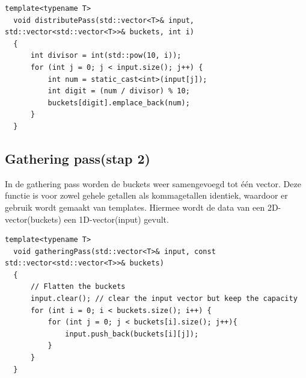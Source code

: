\documentclass{article}
\begin{document}
\begin{lstlisting}[caption={Distribution pass}, label={lst:distribution}]
  template<typename T>
  void distributePass(std::vector<T>& input, std::vector<std::vector<T>>& buckets, int i)
  {   
      int divisor = int(std::pow(10, i));
      for (int j = 0; j < input.size(); j++) {
          int num = static_cast<int>(input[j]);
          int digit = (num / divisor) % 10;
          buckets[digit].emplace_back(num);
      }
  }
\end{lstlisting}
\subsection{Gathering pass(stap 2)}
In de gathering pass worden de buckets weer samengevoegd tot één vector. Deze functie is voor zowel gehele getallen als kommagetallen identiek, 
waardoor er gebruik wordt gemaakt van templates. Hiermee wordt de data van een 2D-vector(buckets) een 1D-vector(input) gevult.

\newpage
\begin{lstlisting}[caption={Gathering pass}, label={lst:gathering}]
  template<typename T>
  void gatheringPass(std::vector<T>& input, const std::vector<std::vector<T>>& buckets)
  {       
      // Flatten the buckets
      input.clear(); // clear the input vector but keep the capacity
      for (int i = 0; i < buckets.size(); i++) {
          for (int j = 0; j < buckets[i].size(); j++){
              input.push_back(buckets[i][j]);
          }
      }
  }
\end{lstlisting}
\end{document}
